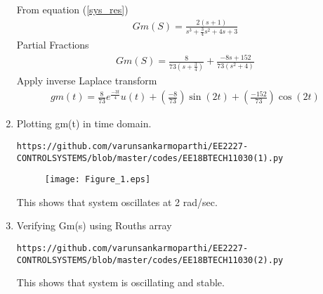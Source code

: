 \begin{enumerate}[label=\thesection.\arabic*.,ref=\thesection.\theenumi]
\solution
From equation (\ref{sys_res})
\begin{align}
 Gm(S) = \frac{2(s+1)}{s^3+\frac{3}{4}s^2+4s+3} 
\end{align}
Partial Fractions
\begin{align}
 Gm(S) = \frac{8}{73(s+\frac{3}{4})}+ \frac{-8s+152}{73(s^2+4)}
\end{align}
Apply inverse Laplace transform
\begin{align}
 gm(t) = \frac{8}{73}e^{\frac{-3t}{4}}u(t)+ (\frac{-8}{73})\sin(2t) +(\frac{-152}{73})\cos(2t)
\end{align}



\item Plotting gm(t) in time domain.
\begin{lstlisting}
https://github.com/varunsankarmoparthi/EE2227-CONTROLSYSTEMS/blob/master/codes/EE18BTECH11030(1).py
\end{lstlisting}
\begin{figure}[!h]
  \texttt{[image: Figure\_1.eps]}
 
\end{figure}

This shows that system oscillates at 2 rad/sec.
\item Verifying Gm(s) using Rouths array
\begin{lstlisting}
https://github.com/varunsankarmoparthi/EE2227-CONTROLSYSTEMS/blob/master/codes/EE18BTECH11030(2).py
\end{lstlisting}
This shows that system is oscillating and stable.
\end{enumerate}
